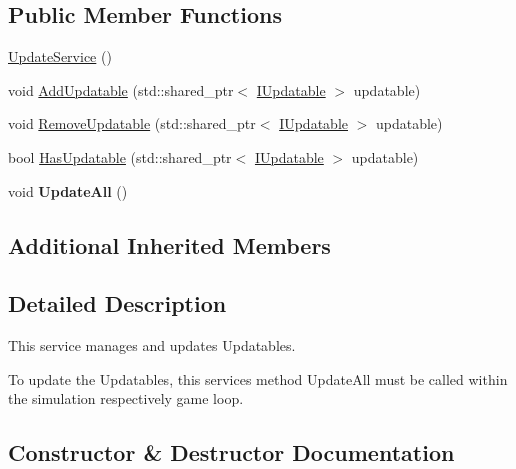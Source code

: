 \subsection*{Public Member Functions}
\begin{DoxyCompactItemize}
\item 
\hyperlink{classastu_1_1UpdateService_ae4d88fb4772931e35f7c46b7d756b4c8}{Update\+Service} ()
\item 
void \hyperlink{classastu_1_1UpdateService_a83ff161f4280681a50b728e2ac157cf6}{Add\+Updatable} (std\+::shared\+\_\+ptr$<$ \hyperlink{classastu_1_1IUpdatable}{I\+Updatable} $>$ updatable)
\item 
void \hyperlink{classastu_1_1UpdateService_a04911354dbfbf3849fafda10209710b6}{Remove\+Updatable} (std\+::shared\+\_\+ptr$<$ \hyperlink{classastu_1_1IUpdatable}{I\+Updatable} $>$ updatable)
\item 
bool \hyperlink{classastu_1_1UpdateService_aaffeece0ab9fd8fff1020763cd72de13}{Has\+Updatable} (std\+::shared\+\_\+ptr$<$ \hyperlink{classastu_1_1IUpdatable}{I\+Updatable} $>$ updatable)
\item 
\mbox{\label{classastu_1_1UpdateService_a9ee615ce365e1910446a2646b0a2ad9a}} 
void {\bfseries Update\+All} ()
\end{DoxyCompactItemize}
\subsection*{Additional Inherited Members}


\subsection{Detailed Description}
This service manages and updates {\ttfamily Updatables}.

To update the {\ttfamily Updatables}, this service\textquotesingle{}s method {\ttfamily Update\+All} must be called within the simulation respectively game loop. 

\subsection{Constructor \& Destructor Documentation}
\mbox{\label{classastu_1_1UpdateService_ae4d88fb4772931e35f7c46b7d756b4c8}} 
